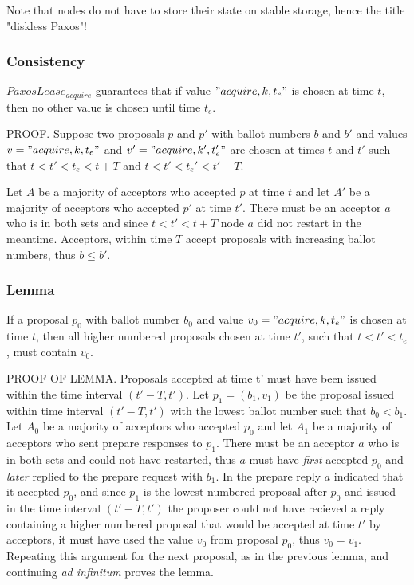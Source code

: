 \documentclass[12pt]{article}
\begin{document}
Note that nodes do not have to store their state on stable storage, hence the title "diskless Paxos"!

\subsubsection{ Consistency } $PaxosLease_{acquire}$ guarantees that if value $"acquire, k, t_e"$ is chosen at time $t$, then no other value is chosen until time $t_e$.

PROOF. Suppose two proposals $p$ and $p'$ with ballot numbers $b$ and $b'$ and values $v = "acquire, k, t_e"$ and $v' = "acquire, k', t_e'"$ are chosen at times $t$ and $t'$ such that $t < t' < t_e < t + T$ and $t < t' < t_e' < t' + T$.


Let $A$ be a majority of acceptors who accepted $p$ at time $t$ and let $A'$ be a majority of acceptors who accepted $p'$ at time $t'$.  There must be an acceptor $a$ who is in both sets and since $t < t' < t + T$ node $a$ did not restart in the meantime. Acceptors, within time $T$ accept proposals with increasing ballot numbers, thus $b \leq b'$.

\subsubsection{ Lemma } If a proposal $p_0$ with ballot number $b_0$ and value $v_0 = "acquire, k, t_e"$ is chosen at time $t$, then all higher numbered proposals chosen at time $t'$, such that $t < t' < t_e$, must contain $v_0$.

PROOF OF LEMMA. Proposals accepted at time t' must have been issued within the time interval $(t' - T, t')$. Let $p_1 = (b_1, v_1)$ be the proposal issued within time interval $(t' - T, t')$ with the lowest ballot number such that $b_0 < b_1$. Let $A_0$ be a majority of acceptors who accepted $p_0$ and let $A_1$ be a majority of acceptors who sent prepare responses to $p_1$. There must be an acceptor $a$ who is in both sets and could not have restarted, thus $a$ must have \emph{first} accepted $p_0$ and \emph{later} replied to the prepare request with $b_1$. In the prepare reply $a$ indicated that it accepted $p_0$, and since $p_1$ is the lowest numbered proposal after $p_0$ and issued in the time interval $(t' - T, t')$ the proposer could not have recieved a reply containing a higher numbered proposal that would be accepted at time $t'$ by acceptors, it must have used the value $v_0$ from proposal $p_0$, thus $v_0 = v_1$. Repeating this argument for the next proposal, as in the previous lemma, and continuing \emph{ad infinitum} proves the lemma.
\end{document}
